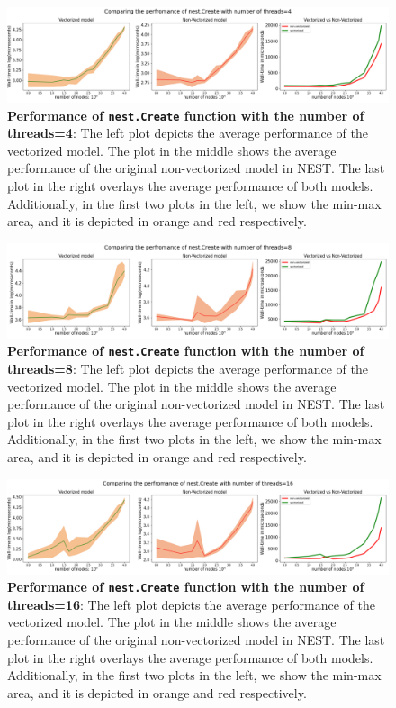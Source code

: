 \begin{figure}[ht!]
    \centering
    \includegraphics[width=\textwidth]{src/pic/thread_4.png}
    \caption{\textbf{Performance of \texttt{nest.Create} function with the number of threads=4}: The left plot depicts the average performance of the vectorized model. The plot in the middle shows the average performance of the original non-vectorized model in NEST. The last plot in the right overlays the average performance of both models. Additionally, in the first two plots in the left, we show the min-max area, and it is depicted in orange and red respectively.}
    \label{fig:threads_4}
\end{figure}

\begin{figure}[ht!]
    \centering
    \includegraphics[width=\textwidth]{src/pic/thread_8.png}
    \caption{\textbf{Performance of \texttt{nest.Create} function with the number of threads=8}: The left plot depicts the average performance of the vectorized model. The plot in the middle shows the average performance of the original non-vectorized model in NEST. The last plot in the right overlays the average performance of both models. Additionally, in the first two plots in the left, we show the min-max area, and it is depicted in orange and red respectively.}
    \label{fig:threads_8}
\end{figure}


\begin{figure}[ht!]
    \centering
    \includegraphics[width=\textwidth]{src/pic/thread_16.png}
    \caption{\textbf{Performance of \texttt{nest.Create} function with the number of threads=16}: The left plot depicts the average performance of the vectorized model. The plot in the middle shows the average performance of the original non-vectorized model in NEST. The last plot in the right overlays the average performance of both models. Additionally, in the first two plots in the left, we show the min-max area, and it is depicted in orange and red respectively.}
    \label{fig:threads_16}
\end{figure}


